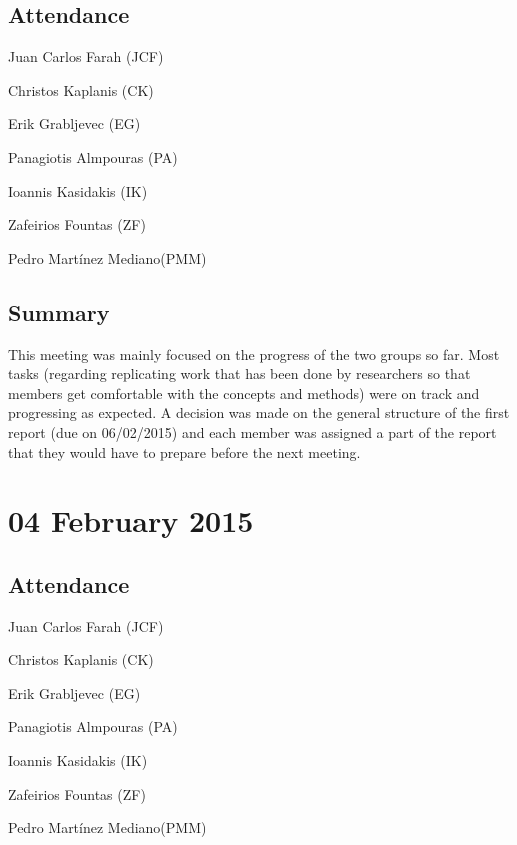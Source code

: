 \documentclass[a4paper,11pt]{article}
\begin{document}
\subsection*{Attendance}
\begin{compactenum}
\item Juan Carlos Farah (JCF)
\item Christos Kaplanis (CK)
\item Erik Grabljevec (EG)
\item Panagiotis Almpouras (PA)
\item Ioannis Kasidakis (IK)
\item Zafeirios Fountas (ZF)
\item Pedro Martínez Mediano(PMM)
\end{compactenum}

\subsection*{Summary}
This meeting was mainly focused on the progress of the two groups so far. Most tasks (regarding replicating work that has been done by researchers so that members get comfortable with the concepts and methods) were on track and progressing as expected. A decision was made on the general structure of the first report (due on 06/02/2015) and each member was assigned a part of the report that they would have to prepare before the next meeting.

\maketitle
\section*{04 February 2015}
\subsection*{Attendance}
\begin{compactenum}
\item Juan Carlos Farah (JCF)
\item Christos Kaplanis (CK)
\item Erik Grabljevec (EG)
\item Panagiotis Almpouras (PA)
\item Ioannis Kasidakis (IK)
\item Zafeirios Fountas (ZF)
\item Pedro Martínez Mediano(PMM)
\end{compactenum}
\end{document}
